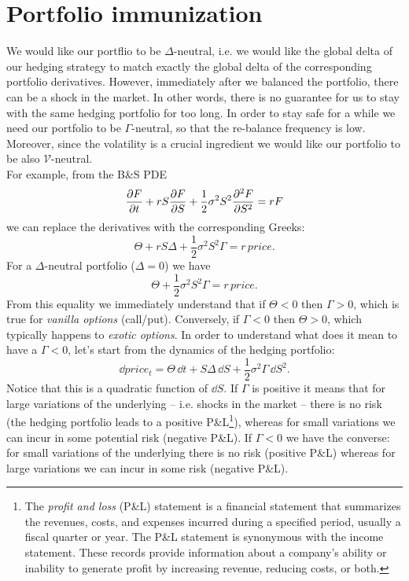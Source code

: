 \section{Portfolio immunization}
We would like our portflio to be $\Delta$-neutral, i.e. we would like the global delta of our hedging strategy to match exactly the global delta of the corresponding portfolio derivatives. However, immediately after we balanced the portfolio, there can be a shock in the market. In other words, there is no guarantee for us to stay with the same hedging portfolio for too long. In order to stay safe for a while we need our portfolio to be $\Gamma$-neutral, so that the re-balance frequency is low. Moreover, since the volatility is a crucial ingredient we would like our portfolio to be also $\mathcal{V}$-neutral.\\
For example, from the B\&S PDE
\begin{equation}
    \pdv{F}{t} + rS\pdv{F}{S} + \frac{1}{2}\sigma^2S^2\pdv[2]{F}{S} = rF
\end{equation}
we can replace the derivatives with the corresponding Greeks:
\begin{equation}
    \Theta + rS\Delta + \frac{1}{2}\sigma^2S^2 \Gamma = r\, price.
\end{equation}
For a $\Delta$-neutral portfolio ($\Delta = 0$) we have
\begin{equation}
    \Theta + \frac{1}{2}\sigma^2S^2 \Gamma = r\, price.
\end{equation}
From this equality we immediately understand that if $\Theta<0$ then $\Gamma>0$, which is true for \emph{vanilla options} (call/put). Conversely, if $\Gamma<0$ then $\Theta>0$, which typically happens to \emph{exotic options}. In order to understand what does it mean to have a $\Gamma<0$, let's start from the dynamics of the hedging portfolio:
\begin{equation}
    \dd price_t = \Theta\,\dd t + S\Delta\,\dd S + \frac{1}{2}\sigma^2\Gamma\,\dd S^2.
\end{equation}
Notice that this is a quadratic function of $\dd S$. If $\Gamma$ is positive it means that for large variations of the underlying -- i.e. shocks in the market -- there is no risk (the hedging portfolio leads to a positive P\&L\footnote{The \emph{profit and loss} (P\&L) statement is a financial statement that summarizes the revenues, costs, and expenses incurred during a specified period, usually a fiscal quarter or year. The P\&L statement is synonymous with the income statement. These records provide information about a company's ability or inability to generate profit by increasing revenue, reducing costs, or both.}), whereas for small variations we can incur in some potential risk (negative P\&L). If $\Gamma<0$ we have the converse: for small variations of the underlying there is no risk (positive P\&L) whereas for large variations we can incur in some risk (negative P\&L).
